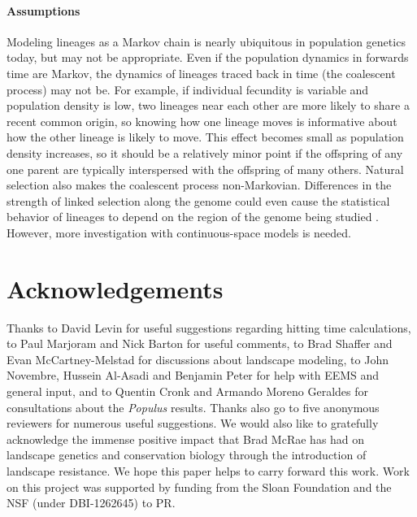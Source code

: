 \documentclass{article}
\newif\ifsubmission
\begin{document}
\paragraph{Assumptions}
Modeling lineages as a Markov chain is nearly ubiquitous in population genetics today,
but may not be appropriate.
Even if the population dynamics in forwards time are Markov, 
the dynamics of lineages traced back in time (the coalescent process) may not be. 
For example, if individual fecundity is variable and population density is low,  
two lineages near each other are more likely to share a recent common origin, 
so knowing how one lineage moves is informative about how the other lineage is likely to move. 
This effect becomes small as population density increases, 
so it should be a relatively minor point if the offspring
of any one parent are typically interspersed with the offspring of many others. 
Natural selection also makes the coalescent process non-Markovian.
Differences in the strength of linked selection along the genome
could even cause the statistical behavior of lineages to depend
on the region of the genome being studied \citep{wang2014isolation,li2016local}.
However, more investigation with continuous-space models is needed.



\section*{Acknowledgements}

Thanks to David Levin for useful suggestions regarding hitting time calculations,
to Paul Marjoram and Nick Barton for useful comments,
to Brad Shaffer and Evan McCartney-Melstad for discussions about landscape modeling,
to John Novembre, Hussein Al-Asadi and Benjamin Peter for help with EEMS
and general input,
and to Quentin Cronk and Armando Moreno Geraldes for consultations about the \emph{Populus} results.
Thanks also go to five anonymous reviewers for numerous useful suggestions.
We would also like to gratefully acknowledge the immense positive impact that Brad McRae \citep[1966--2017;][]{lawler2018tribute}
has had on landscape genetics and conservation biology through the introduction of landscape resistance.
We hope this paper helps to carry forward this work.
Work on this project was supported by funding from
the Sloan Foundation and the NSF (under DBI-1262645) to PR.




\ifsubmission
\processdelayedfloats
\fi
\end{document}
